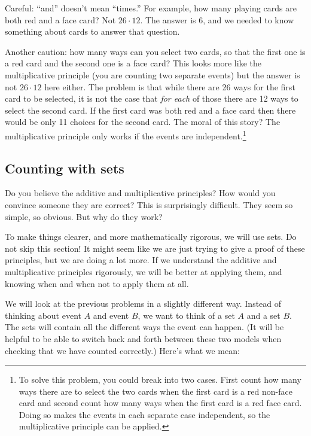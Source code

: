 \documentclass[12pt]{article}
\begin{document}
 Careful: ``and'' doesn't mean ``times.''  For example, how many playing cards are both red and a face card?  Not $26 \cdot 12$.  The answer is 6, and we needed to know something about cards to answer that question.  
 
 Another caution: how many ways can you select two cards, so that the first one is a red card and the second one is a face card?  This looks more like the multiplicative principle (you are counting two separate events) but the answer is not $26 \cdot 12$ here either.  The problem is that while there are 26 ways for the first card to be selected, it is not the case that {\em for each} of those there are 12 ways to select the second card.  If the first card was both red and a face card then there would be only 11 choices for the second card.  The moral of this story?  The multiplicative principle only works if the events are independent.\footnote{To solve this problem, you could break into two cases. First count how many ways there are to select the two cards when the first card is a red non-face card and second count how many ways when the first card is a red face card.  Doing so makes the events in each separate case independent, so the multiplicative principle can be applied.}

\subsection{Counting with sets}


Do you believe the additive and multiplicative principles?  How would you convince someone they are correct?  This is surprisingly difficult.  They seem so simple, so obvious.  But why do they work?  

To make things clearer, and more mathematically rigorous, we will use sets.  Do not skip this section!  It might seem like we are just trying to give a proof of these principles, but we are doing a lot more.  If we understand the additive and multiplicative principles rigorously, we will be better at applying them, and knowing when and when not to apply them at all.

We will look at the previous problems in a slightly different way.  Instead of thinking about event $A$ and event $B$, we want to think of a set $A$ and a set $B$.  The sets will contain all the different ways the event can happen.  (It will be helpful to be able to switch back and forth between these two models when checking that we have counted correctly.)  Here's what we mean:
\end{document}
